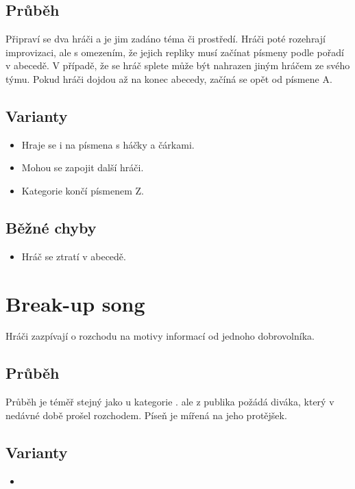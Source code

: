 \subsection{Průběh} Připraví se dva hráči a je jim zadáno téma či prostředí. Hráči poté rozehrají improvizaci, ale s omezením, že jejich repliky musí začínat písmeny podle pořadí v abecedě. V případě, že se hráč splete může být nahrazen jiným hráčem ze svého týmu. Pokud hráči dojdou až na konec abecedy, začíná se opět od písmene A. 
 
\subsection{ Varianty } \begin{itemize}
\item  Hraje se i na písmena s háčky a čárkami.
\item  Mohou se zapojit další hráči.
\item  Kategorie končí písmenem Z.
\end{itemize}
 
\subsection{ Běžné chyby } \begin{itemize}
\item Hráč se ztratí v abecedě.
\end{itemize}
 
 
 
 
 
\needspace{5cm} \section{Break-up song} \label{break-up song}  
 
Hráči zazpívají o rozchodu na motivy informací od jednoho dobrovolníka. 
 
\subsection{ Průběh } Průběh je téměř stejný jako u kategorie .  ale z publika požádá diváka, který v nedávné době prošel rozchodem. Píseň je mířená na jeho protějšek. 
 
\subsection{ Varianty } \begin{itemize}
\item {}
\end{itemize}
 
